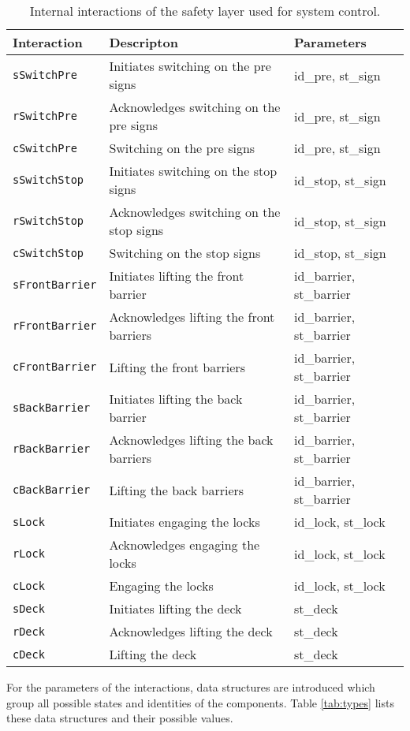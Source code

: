 %
\begin{table}%
\begin{tabular}{lll}
			\textbf{Interaction} &	\textbf{Descripton}	&	\textbf{Parameters}\\
  		\hline
  		
			\texttt{sSwitchPre} & Initiates switching on the pre signs & id\_pre, st\_sign\\
      \texttt{rSwitchPre} & Acknowledges switching on the pre signs & id\_pre, st\_sign\\
      \texttt{cSwitchPre} & Switching on the pre signs & id\_pre, st\_sign\\
            
      \texttt{sSwitchStop} & Initiates switching on the stop signs & id\_stop, st\_sign\\
      \texttt{rSwitchStop} & Acknowledges switching on the stop signs & id\_stop, st\_sign\\
      \texttt{cSwitchStop} & Switching on the stop signs & id\_stop, st\_sign\\
            
      \texttt{sFrontBarrier} & Initiates lifting the front barrier & id\_barrier, st\_barrier\\
      \texttt{rFrontBarrier} & Acknowledges lifting the front barriers & id\_barrier, st\_barrier\\
      \texttt{cFrontBarrier} & Lifting the front barriers & id\_barrier, st\_barrier\\
      
      \texttt{sBackBarrier} & Initiates lifting the back barrier & id\_barrier, st\_barrier\\
      \texttt{rBackBarrier} & Acknowledges lifting the back barriers & id\_barrier, st\_barrier\\
      \texttt{cBackBarrier} & Lifting the back barriers & id\_barrier, st\_barrier\\
      
      \texttt{sLock} & Initiates engaging the locks & id\_lock, st\_lock\\
      \texttt{rLock} & Acknowledges engaging the locks & id\_lock, st\_lock\\
      \texttt{cLock} & Engaging the locks & id\_lock, st\_lock\\
      
      \texttt{sDeck} & Initiates lifting the deck & st\_deck\\
      \texttt{rDeck} & Acknowledges lifting the deck & st\_deck\\
      \texttt{cDeck} & Lifting the deck & st\_deck\\
\end{tabular}
\caption{Internal interactions of the safety layer used for system control.}
\label{tab:tau}
\end{table}
%
For the parameters of the interactions, data structures are introduced which group all possible states and identities of the components. Table \ref{tab:types} lists these data structures and their possible values.

